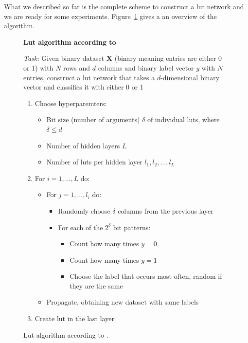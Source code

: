 What we described so far is the complete scheme to construct a lut network and we are ready for some experiments. Figure~\ref{fig:lut_algo} gives a an overview of the algorithm.

\begin{figure}[!htb]
\begin{tcolorbox}[colback=white]
    \textbf{Lut algorithm according to \cite{chatterjee2018learning}}
    \vspace{0.5em}

    \textit{Task:} Given binary dataset $\boldsymbol{X}$ (binary meaning entries are either 0 or 1) with $N$ rows and $d$ columns and binary label vector $y$ with $N$ entries, construct a lut network that takes a $d$-dimensional binary vector and classifies it with either 0 or 1
    \vspace{0.5em}

    \begin{enumerate}
        \item Choose hyperparemters:
            \begin{itemize}
                \item Bit size (number of arguments) $\delta$ of individual luts, where $\delta \leq d$
                \item Number of hidden layers $L$
                \item Number of luts per hidden layer $l_1, l_2, \dots, l_L$
            \end{itemize}
        \item For $i=1, \dots, L$ do:
            \begin{itemize}
                \item For $j=1, \dots, l_i$ do:
                    \begin{itemize}
                        \item Randomly choose $\delta$ columns from the previous layer
                        \item For each of the $2^\delta$ bit patterns:
                            \begin{itemize}
                                \item Count how many times $y=0$
                                \item Count how many times $y=1$
                                \item Choose the label that occurs most often, random if they are the same
                            \end{itemize}
                    \end{itemize}
                \item Propagate, obtaining new dataset with same labels
            \end{itemize}
        \item Create lut in the last layer
    \end{enumerate}
\end{tcolorbox}
\caption{Lut algorithm according to \cite{chatterjee2018learning}.}
\label{fig:lut_algo}
\end{figure}


